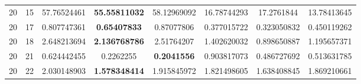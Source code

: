 \documentclass[runningheads]{llncs}
\begin{document}
\begin{table}[h!tb]
{\begin{tabular}{|c|c||c|c|c||c|c|c|}
    20 & 15 & 57.76524461 & \textbf{55.55811032} & 58.12969092 & 16.78744293 & 17.2761844 & 13.78413645 \\
    20 & 17 & 0.807747361 & \textbf{0.65407833} & 0.87077806 & 0.377015722 & 0.323050832 & 0.450119262 \\
    20 & 18 & 2.648213694 & \textbf{2.136768786} & 2.51764207 & 1.402620032 & 0.898650887 & 1.195657371 \\
    20 & 21 & 0.624442455 & 0.2262255 & \textbf{0.2041556} & 0.903817073 & 0.486727692 & 0.513631785 \\
    20 & 22 & 2.030148903 & \textbf{1.578348414} & 1.915845972 & 1.821498605 & 1.638408845 & 1.869210661\\
    \hline
    \end{tabular}}
    \label{tab:my_label}
\end{table}
\hfill\break
\end{document}
